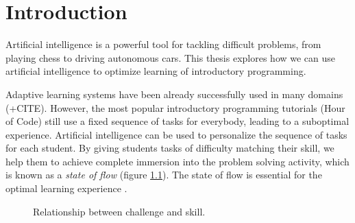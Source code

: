 \chapter{Introduction}
\label{chap:introduction}

Artificial intelligence is a powerful tool for tackling difficult problems,
from playing chess to driving autonomous cars. %
This thesis explores how we can use artificial intelligence to optimize
learning of introductory programming.

Adaptive learning systems have been already successfully used in many domains
\cite{alg.evaluation-geography} (+CITE).
However, the most popular introductory programming tutorials
(Hour of Code) still use a fixed sequence of tasks for everybody,
leading to a suboptimal experience.
Artificial intelligence can be used to personalize the sequence of tasks
for each student.
By giving students tasks of difficulty matching their skill,
we help them to achieve complete immersion into the problem solving
activity, which is known as a \emph{state of flow} \cite{flow}
(figure \ref{fig:flow}).
The state of flow is essential for the optimal learning experience
\cite{adaptive-practice}.

\begin{figure}[htb]
  \centering
  \caption{Relationship between challenge and skill.}
  \label{fig:flow}
\end{figure}


